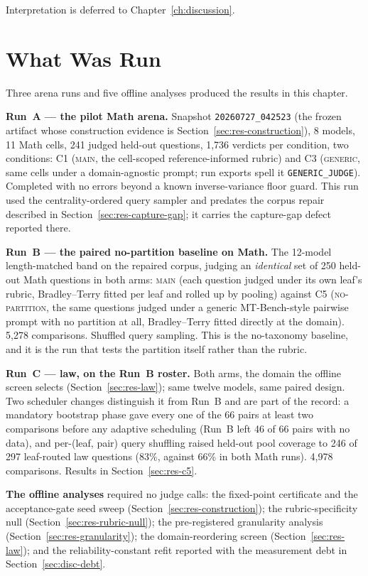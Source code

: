 Interpretation is deferred to Chapter~\ref{ch:discussion}.

\section{What Was Run}\label{sec:res-runs}

Three arena runs and five offline analyses produced the results in this
chapter.

\textbf{Run~A --- the pilot Math arena.}
Snapshot \texttt{20260727\_042523} (the frozen artifact whose
construction evidence is Section~\ref{sec:res-construction}), 8
models, 11 Math cells, 241 judged held-out questions, 1{,}736 verdicts
per condition, two conditions: C1 (\textsc{main}, the cell-scoped
reference-informed rubric) and C3 (\textsc{generic}, same cells under a
domain-agnostic prompt; run exports spell it
\texttt{GENERIC\_JUDGE}). Completed
with no errors beyond a known inverse-variance floor guard. This run
used the centrality-ordered query sampler and predates the corpus
repair described in Section~\ref{sec:res-capture-gap}; it carries the
capture-gap defect reported there.

\textbf{Run~B --- the paired no-partition baseline on Math.}
The 12-model length-matched band on the repaired corpus, judging an
\emph{identical} set of 250 held-out Math questions in both arms:
\textsc{main} (each question judged under its own leaf's rubric,
Bradley--Terry fitted per leaf and rolled up by pooling) against
C5 (\textsc{no-partition}, the same questions judged under a generic
MT-Bench-style pairwise prompt with no partition at all,
Bradley--Terry fitted
directly at the domain). 5{,}278 comparisons. Shuffled query sampling.
This is the no-taxonomy baseline, and it is the run that tests the
partition itself rather than the rubric.

\textbf{Run~C --- law, on the Run~B roster.} Both arms, the domain the
offline screen selects (Section~\ref{sec:res-law}); same twelve models,
same paired design. Two scheduler changes distinguish it from Run~B and
are part of the record: a mandatory bootstrap phase gave every one of
the 66 pairs at least two comparisons before any adaptive scheduling
(Run~B left 46 of 66 pairs with no data), and per-(leaf, pair) query
shuffling raised held-out pool coverage to 246 of 297 leaf-routed law
questions (83\%, against 66\% in both Math runs). 4{,}978 comparisons.
Results in Section~\ref{sec:res-c5}.

\textbf{The offline analyses} required no judge calls: the fixed-point
certificate and the acceptance-gate seed sweep
(Section~\ref{sec:res-construction}); the rubric-specificity null
(Section~\ref{sec:res-rubric-null}); the pre-registered granularity
analysis (Section~\ref{sec:res-granularity}); the domain-reordering
screen (Section~\ref{sec:res-law}); and the reliability-constant refit
reported with the measurement debt in Section~\ref{sec:disc-debt}.

